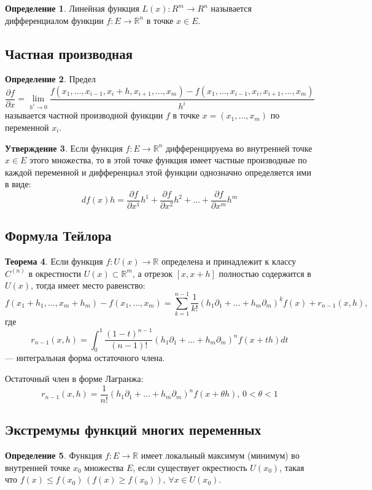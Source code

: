 \documentclass[12pt]{report}
\theoremstyle{definition}
\newtheorem{theorem}{Теорема}[chapter]
\newtheorem{definition}[theorem]{Определение}
\newtheorem{statement}[theorem]{Утверждение}
\newcommand{\R}{\mathbb R}
\begin{document}
\begin{definition}
Линейная функция $L(x): R^m \rightarrow R^n$ называется дифференциалом
функции $f: E \rightarrow \R^n$ в точке $x \in E$.
\end{definition}

\subsection{Частная производная}
\begin{definition}
Предел
$$
\dfrac{\partial f}{\partial x} = 
\lim\limits_{h^i \rightarrow 0} \dfrac{f(x_1, \dots, x_{i-1}, x_i + h, x_{i+1}, \dots, x_m) 
- f(x_1, \dots, x_{i-1}, x_i, x_{i+1}, \dots, x_m)}{h^i}
$$
называется частной производной функции $f$ в точке $x = (x_1, \dots, x_m)$ по переменной $x_i$.
\end{definition}

\begin{statement}
Если функция $f: E \rightarrow \R^n$ дифференцируема во внутренней точке
$x \in E$ этого множества, то в этой точке функция имеет частные производные
по каждой переменной и дифференциал этой функции однозначно определяется ими в виде:
$$
df(x)h = \dfrac{\partial f}{\partial x^1}h^1 + \dfrac{\partial f}{\partial x^2} h^2 
+ \dots + \dfrac{\partial f}{\partial x^m} h^m
$$
\end{statement}

\subsection{Формула Тейлора}
\begin{theorem}
Если функция $f: U(x) \rightarrow \R$ определена и принадлежит к классу
$C^{(n)}$ в окрестности $U(x) \subset \R^m$, а отрезок $[x, x+h]$ полностью
содержится в $U(x)$, тогда имеет место равенство:
$$
f(x_1 + h_1, \dots, x_m + h_m) - f(x_1, \dots, x_m) =
\sum\limits_{k=1}^{n-1} \dfrac{1}{k!} (h_1 \partial_1 + \dots + h_m \partial_m)^k f(x) + r_{n-1}(x, h),
$$
где
$$
r_{n-1}(x, h) = \int_0^1 \dfrac{(1 - t)^{n-1}}{(n - 1)!} (h_1 \partial_1 + \dots + h_m \partial_m)^n f(x + th) dt
$$
--- интегральная форма остаточного члена.

Остаточный член в форме Лагранжа:
$$
r_{n-1}(x, h) = \dfrac{1}{n!} (h_1 \partial_1 + \dots + h_m \partial_m)^n f(x + \theta h),
\, 0 < \theta < 1
$$
\end{theorem}

\subsection{Экстремумы функций многих переменных}
\begin{definition}
Функция $f: E \rightarrow \R$ имеет локальный максимум (минимум)
во внутренней точке $x_0$ множества $E$, если существует окрестность
$U(x_0)$, такая что $f(x) \le f(x_0)\,(f(x) \ge f(x_0)), \, \forall x \in U(x_0)$.
\end{definition}
\end{document}
